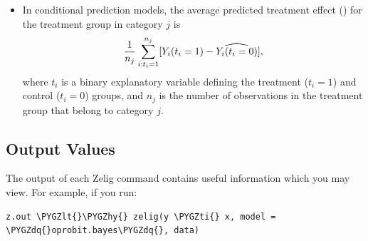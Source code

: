 \documentclass[letterpaper,10pt,english]{sphinxmanual}
\def\PYGZlt{\char`\<}
\def\PYGZhy{\char`\-}
\def\PYGZdq{\char`\"}
\def\PYGZti{\char`\~}
\begin{document}
\begin{itemize}
\item {} 
In conditional prediction models, the average predicted treatment
effect () for the treatment group in category \(j\)
is
\begin{gather}
\begin{split}\begin{aligned}
\frac{1}{n_j}\sum_{i:t_{i}=1}^{n_j}[Y_{i}(t_{i}=1)-\widehat{Y_{i}(t_{i}=0)}],\end{aligned}\end{split}\notag
\end{gather}
where \(t_{i}\) is a binary explanatory variable defining the
treatment (\(t_{i}=1\)) and control (\(t_{i}=0\)) groups, and
\(n_j\) is the number of observations in the treatment group that
belong to category \(j\).

\end{itemize}


\subsection{Output Values}
\label{vignette:id97}
The output of each Zelig command contains useful information which you
may view. For example, if you run:

\begin{Verbatim}[commandchars=\\\{\}]
z.out \PYGZlt{}\PYGZhy{} zelig(y \PYGZti{} x, model = \PYGZdq{}oprobit.bayes\PYGZdq{}, data)
\end{Verbatim}
\end{document}
